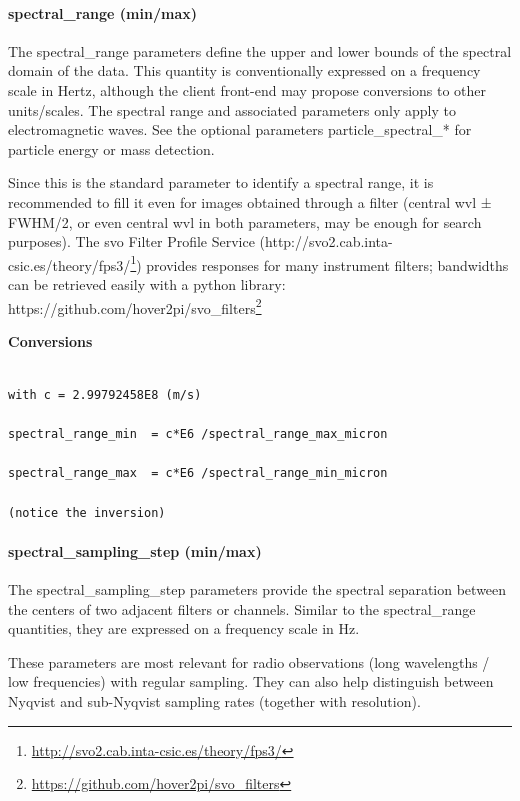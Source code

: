 \documentclass[11pt,a4paper]{ivoa}
\begin{document}
\paragraph{spectral\_range (min/max)}

The spectral\_range parameters define the upper and lower bounds of the spectral domain of the data. This quantity is conventionally expressed on a frequency scale in Hertz, although the client front-end may propose conversions to other units/scales. The spectral range and associated parameters only apply to electromagnetic waves. See the optional parameters particle\_spectral\_* for particle energy or mass detection.

Since this is the standard parameter to identify a spectral range, it is recommended to fill it even for images obtained through a filter (central wvl ± FWHM/2, or even central wvl in both parameters, may be enough for search purposes). The svo Filter Profile Service (http://svo2.cab.inta-csic.es/theory/fps3/\footnote{\url{http://svo2.cab.inta-csic.es/theory/fps3/}}) provides responses for many instrument filters; bandwidths can be retrieved easily with a python library: https://github.com/hover2pi/svo\_filters\footnote{\url{https://github.com/hover2pi/svo_filters}}


\textbf{Conversions}

\begin{verbatim}

with c = 2.99792458E8 (m/s)

spectral_range_min  = c*E6 /spectral_range_max_micron

spectral_range_max  = c*E6 /spectral_range_min_micron

(notice the inversion)

\end{verbatim}

\paragraph{spectral\_sampling\_step (min/max)}

The spectral\_sampling\_step parameters provide the spectral separation between the centers of two adjacent filters or channels. Similar to the spectral\_range quantities, they are expressed on a frequency scale in Hz. 

These parameters are most relevant for radio observations (long wavelengths / low frequencies) with regular sampling. They can also help distinguish between Nyqvist and sub-Nyqvist sampling rates (together with resolution).
\end{document}
